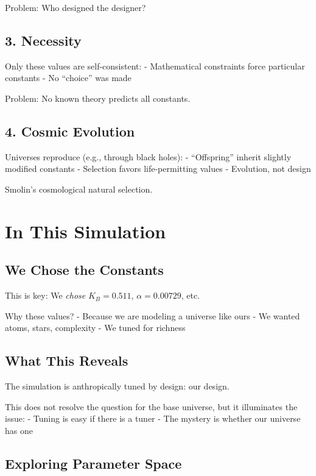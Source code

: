 \documentclass[
  11pt,
  letterpaper,
  twoside,
  openright]{book}
\begin{document}
Problem: Who designed the designer?

\subsection{3. Necessity}\label{necessity}

Only these values are self-consistent: - Mathematical constraints force
particular constants - No ``choice'' was made

Problem: No known theory predicts all constants.

\subsection{4. Cosmic Evolution}\label{cosmic-evolution}

Universes reproduce (e.g., through black holes): - ``Offspring'' inherit
slightly modified constants - Selection favors life-permitting values -
Evolution, not design

Smolin's cosmological natural selection.

\section{In This Simulation}\label{in-this-simulation}

\subsection{We Chose the Constants}\label{we-chose-the-constants}

This is key: We \emph{chose} \(K_B = 0.511\), \(\alpha = 0.00729\), etc.

Why these values? - Because we are modeling a universe like ours - We
wanted atoms, stars, complexity - We tuned for richness

\subsection{What This Reveals}\label{what-this-reveals}

The simulation is anthropically tuned by design: our design.

This does not resolve the question for the base universe, but it
illuminates the issue: - Tuning is easy if there is a tuner - The
mystery is whether our universe has one

\subsection{Exploring Parameter Space}\label{exploring-parameter-space}
\end{document}

